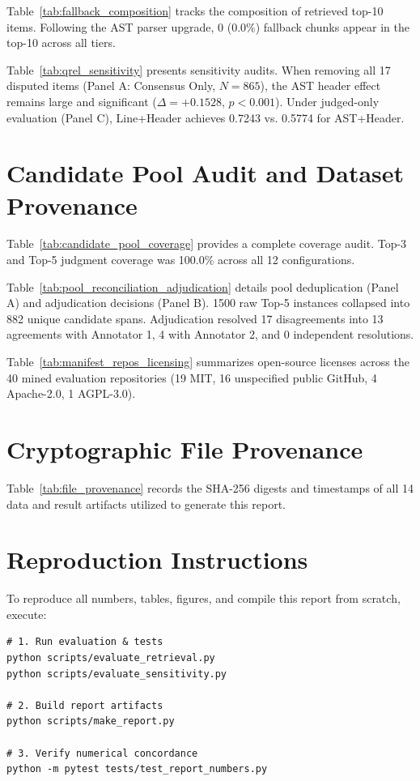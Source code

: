 \documentclass[conference]{IEEEtran}
\begin{document}


Table~\ref{tab:fallback_composition} tracks the composition of retrieved top-10 items. Following the AST parser upgrade, 0 (0.0\%) fallback chunks appear in the top-10 across all tiers.



Table~\ref{tab:qrel_sensitivity} presents sensitivity audits. When removing all 17 disputed items (Panel A: Consensus Only, $N=865$), the AST header effect remains large and significant ($\Delta = +0.1528$, $p < 0.001$). Under judged-only evaluation (Panel C), Line+Header achieves 0.7243 vs. 0.5774 for AST+Header.



\FloatBarrier
\section{Candidate Pool Audit and Dataset Provenance}
Table~\ref{tab:candidate_pool_coverage} provides a complete coverage audit. Top-3 and Top-5 judgment coverage was 100.0\% across all 12 configurations.



Table~\ref{tab:pool_reconciliation_adjudication} details pool deduplication (Panel A) and adjudication decisions (Panel B). 1500 raw Top-5 instances collapsed into 882 unique candidate spans. Adjudication resolved 17 disagreements into 13 agreements with Annotator 1, 4 with Annotator 2, and 0 independent resolutions.



Table~\ref{tab:manifest_repos_licensing} summarizes open-source licenses across the 40 mined evaluation repositories (19 MIT, 16 unspecified public GitHub, 4 Apache-2.0, 1 AGPL-3.0).



\FloatBarrier
\clearpage
\onecolumn
\appendices
\section{Cryptographic File Provenance}
Table~\ref{tab:file_provenance} records the SHA-256 digests and timestamps of all 14 data and result artifacts utilized to generate this report.



\section{Reproduction Instructions}
To reproduce all numbers, tables, figures, and compile this report from scratch, execute:
{\footnotesize
\begin{verbatim}
# 1. Run evaluation & tests
python scripts/evaluate_retrieval.py
python scripts/evaluate_sensitivity.py

# 2. Build report artifacts
python scripts/make_report.py

# 3. Verify numerical concordance
python -m pytest tests/test_report_numbers.py
\end{verbatim}
}
\end{document}
